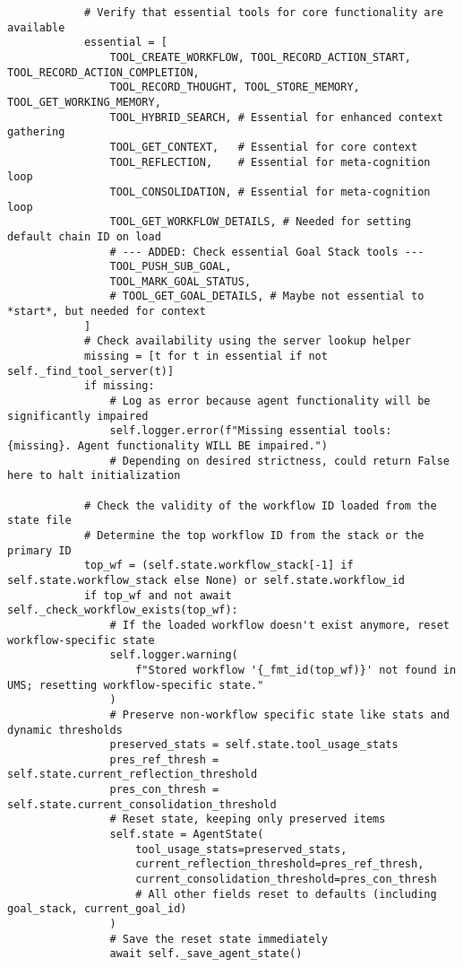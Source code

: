 \documentclass[12pt,a4paper]{article}
\begin{document}
\begin{pageablecode}
\begin{verbatim}
            # Verify that essential tools for core functionality are available
            essential = [
                TOOL_CREATE_WORKFLOW, TOOL_RECORD_ACTION_START, TOOL_RECORD_ACTION_COMPLETION,
                TOOL_RECORD_THOUGHT, TOOL_STORE_MEMORY, TOOL_GET_WORKING_MEMORY,
                TOOL_HYBRID_SEARCH, # Essential for enhanced context gathering
                TOOL_GET_CONTEXT,   # Essential for core context
                TOOL_REFLECTION,    # Essential for meta-cognition loop
                TOOL_CONSOLIDATION, # Essential for meta-cognition loop
                TOOL_GET_WORKFLOW_DETAILS, # Needed for setting default chain ID on load
                # --- ADDED: Check essential Goal Stack tools ---
                TOOL_PUSH_SUB_GOAL,
                TOOL_MARK_GOAL_STATUS,
                # TOOL_GET_GOAL_DETAILS, # Maybe not essential to *start*, but needed for context
            ]
            # Check availability using the server lookup helper
            missing = [t for t in essential if not self._find_tool_server(t)]
            if missing:
                # Log as error because agent functionality will be significantly impaired
                self.logger.error(f"Missing essential tools: {missing}. Agent functionality WILL BE impaired.")
                # Depending on desired strictness, could return False here to halt initialization

            # Check the validity of the workflow ID loaded from the state file
            # Determine the top workflow ID from the stack or the primary ID
            top_wf = (self.state.workflow_stack[-1] if self.state.workflow_stack else None) or self.state.workflow_id
            if top_wf and not await self._check_workflow_exists(top_wf):
                # If the loaded workflow doesn't exist anymore, reset workflow-specific state
                self.logger.warning(
                    f"Stored workflow '{_fmt_id(top_wf)}' not found in UMS; resetting workflow-specific state."
                )
                # Preserve non-workflow specific state like stats and dynamic thresholds
                preserved_stats = self.state.tool_usage_stats
                pres_ref_thresh = self.state.current_reflection_threshold
                pres_con_thresh = self.state.current_consolidation_threshold
                # Reset state, keeping only preserved items
                self.state = AgentState(
                    tool_usage_stats=preserved_stats,
                    current_reflection_threshold=pres_ref_thresh,
                    current_consolidation_threshold=pres_con_thresh
                    # All other fields reset to defaults (including goal_stack, current_goal_id)
                )
                # Save the reset state immediately
                await self._save_agent_state()


\end{verbatim}
\end{pageablecode}
\end{document}
